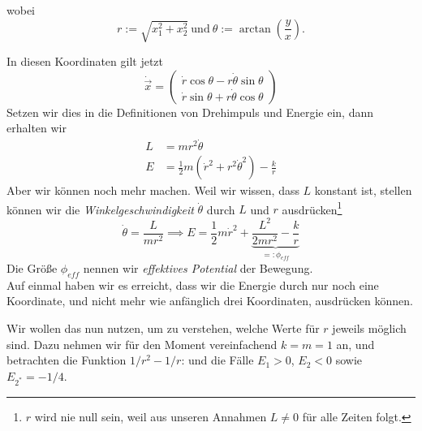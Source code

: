 wobei
\[
r:= \sqrt{x_1^2+x_2^2}~\text{und}~\theta := \arctan\left(\frac{y}{x}\right).
\]
\begin{figure}[h]
  \centering
\end{figure}
In diesen Koordinaten gilt jetzt
\[
\dot{\vec{x}} = \begin{pmatrix} \dot{r} \cos\theta - r\dot{\theta}\sin\theta\\ \dot{r}\sin\theta + r\dot{\theta} \cos\theta\end{pmatrix}
\]
Setzen wir dies in die Definitionen von Drehimpuls und Energie ein, dann erhalten wir
\begin{align*}
L &= mr^2\dot{\theta}\\
E &= \frac{1}{2}m(\dot{r}^2+r^2\dot{\theta}^2)-\frac{k}{r}
\end{align*}
Aber wir können noch mehr machen. Weil wir wissen, dass $L$ konstant ist, stellen können wir die \emph{Winkelgeschwindigkeit} $\dot{\theta}$ durch $L$ und $r$ ausdrücken\footnote{$r$ wird nie null sein, weil aus unseren Annahmen $L\neq0$ für alle Zeiten folgt.}
\[
\dot{\theta} = \frac{L}{mr^2} \implies E = \frac{1}{2}m\dot{r}^2 + \underbrace{\frac{L^2}{2mr^2}- \frac{k}{r}}_{=: \phi_{eff}}
\]
Die Größe $\phi_{eff}$ nennen wir \emph{effektives Potential} der Bewegung.\\
Auf einmal haben wir es erreicht, dass wir die Energie durch nur noch eine Koordinate, und nicht mehr wie anfänglich drei Koordinaten, ausdrücken können. \par
Wir wollen das nun nutzen, um zu verstehen, welche Werte für $r$ jeweils möglich sind. Dazu nehmen wir für den Moment vereinfachend $k=m=1$ an, und betrachten die Funktion $1/r^2-1/r$: und die Fälle $E_1>0$, $E_2<0$ sowie $E_{2^\ast}=-1/4$.
\begin{figure}[h]
  \centering
\end{figure}
